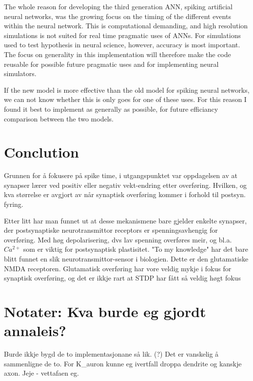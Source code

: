 The whole reason for developing the third generation ANN, spiking artificial neural networks, was the growing focus on the timing of the different events within the neural network.
This is computational demanding, and high resolution simulations is not suited for real time pragmatic uses of ANNs. For simulations used to test hypothesis in neural science, however, accuracy is most important.
The focus on generality in this implementation will therefore make the code reusable for possible future pragmatic uses and for implementing neural simulators.

If the new model is more effective than the old model for spiking neural networks, we can not know whether this is only goes for one of these uses. 
For this reason I found it best to implement as generally as possible, for future efficiancy comparison between the two models.



\section{Conclution}
Grunnen for å fokusere på spike time, i utgangspunktet var oppdagelsen av at synapser lærer ved positiv eller negativ vekt-endring etter overføring. 
Hvilken, og kva størrelse er avgjort av når synaptisk overføring kommer i forhold til postsyn. fyring.

Etter litt har man funnet ut at desse mekanismene bare gjelder enkelte synapser, der postsynaptiske neurotransmittor receptors er spenningsavhengig for overføring. 
Med høg depolarisering, dvs lav spenning overføres meir, og bl.a. $Ca^{2+}$ som er viktig for postsynaptisk plastisitet.
"To my knowledge" har det bare blitt funnet en slik neurotransmittor-sensor i biologien. Dette er den glutamatiske NMDA receptoren.
Glutamatisk overføring har vore veldig mykje i fokus for synaptisk overføring, og det er ikkje rart at STDP har fått så veldig høgt fokus %


\section{Notater: Kva burde eg gjordt annaleis?}
Burde ikkje bygd de to implementasjonane så lik. (?)
Det er vanskelig å sammenligne de to. For K\_auron kunne eg ivertfall droppa dendrite og kanskje axon.
Jeje - vettafaen eg.

